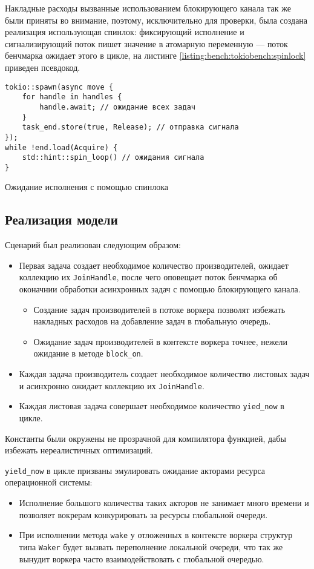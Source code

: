 Накладные расходы вызванные использованием блокирующего канала так же были приняты во внимание, поэтому, исключительно для проверки, была создана реализация использующая спинлок: фиксирующий исполнение и сигнализирующий поток пишет значение в атомарную переменную --- поток бенчмарка ожидает этого в цикле, на листинге \ref{listing:bench:tokiobench:spinlock} приведен псевдокод.

\begin{listing}[H]
    \begin{verbatim}
tokio::spawn(async move {
    for handle in handles {
        handle.await; // ожидание всех задач
    }
    task_end.store(true, Release); // отправка сигнала
});
while !end.load(Acquire) {
    std::hint::spin_loop() // ожидания сигнала
}
    \end{verbatim}
    \caption{Ожидание исполнения с помощью спинлока}
    \label{listing:bench:tokiobench:spinlock}
\end{listing}

\subsection{Реализация модели}

Сценарий был реализован следующим образом:

\begin{itemize}
    \item Первая задача создает необходимое количество производителей, ожидает коллекцию их \verb|JoinHandle|, после чего оповещает поток бенчмарка об оконачнии обработки асинхронных задач с помощью блокирующего канала.
    \begin{itemize}
        \item Создание задач производителей в потоке воркера позволят избежать накладных расходов на добавление задач в глобальную очередь.
        \item Ожидание задач производителей в контексте воркера точнее, нежели ожидание в методе \verb|block_on|.
    \end{itemize}
    \item Каждая задача производитель создает необходимое количество листовых задач и асинхронно ожидает коллекцию их \verb|JoinHandle|.
    \item Каждая листовая задача совершает необходимое количество \verb|yied_now| в цикле.
\end{itemize}

Константы  были окружены не прозрачной для компилятора функцией, дабы избежать нереалистичных оптимизаций.

\verb|yield_now| в цикле призваны эмулировать ожидание акторами ресурса операционной системы:

\begin{itemize}
    \item Исполнение большого количества таких акторов не занимает много времени и позволяет вокрерам конкурировать за ресурсы глобальной очереди.
    \item При исполнении метода \verb|wake| у отложенных в контексте воркера структур типа \verb|Waker| будет вызвать переполнение локальной очереди, что так же вынудит воркера часто взаимодействовать с глобальной очередью.
\end{itemize}
